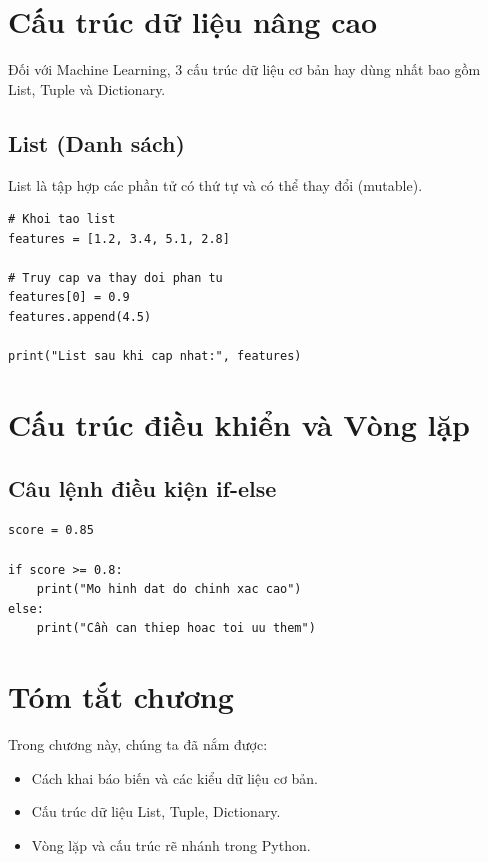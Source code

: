\section{Cấu trúc dữ liệu nâng cao}

Đối với Machine Learning, 3 cấu trúc dữ liệu cơ bản hay dùng nhất bao gồm List, Tuple và Dictionary.

\subsection{List (Danh sách)}
List là tập hợp các phần tử có thứ tự và có thể thay đổi (mutable).

\begin{lstlisting}[caption={Thao tác cơ bản trên List}]
# Khoi tao list
features = [1.2, 3.4, 5.1, 2.8]

# Truy cap va thay doi phan tu
features[0] = 0.9
features.append(4.5)

print("List sau khi cap nhat:", features)
\end{lstlisting}

\section{Cấu trúc điều khiển và Vòng lặp}

\subsection{Câu lệnh điều kiện if-else}
\begin{lstlisting}[caption={Sử dụng cấu trúc điều kiện}]
score = 0.85

if score >= 0.8:
    print("Mo hinh dat do chinh xac cao")
else:
    print("Cần can thiep hoac toi uu them")
\end{lstlisting}

\section{Tóm tắt chương}
Trong chương này, chúng ta đã nắm được:
\begin{itemize}
    \item Cách khai báo biến và các kiểu dữ liệu cơ bản.
    \item Cấu trúc dữ liệu List, Tuple, Dictionary.
    \item Vòng lặp và cấu trúc rẽ nhánh trong Python.
\end{itemize}


